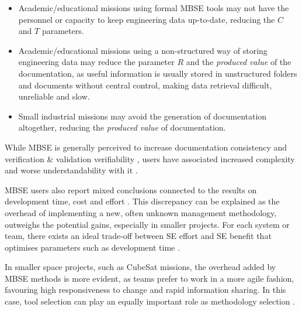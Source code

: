 \documentclass[]{iac}
\begin{document}
\begin{itemize}
    \item Academic/educational missions using formal \acs{MBSE} tools may not have the personnel or capacity to keep engineering data up-to-date, reducing the \(C\) and \(T\) parameters.
    \item Academic/educational missions using a non-structured way of storing engineering data may reduce the parameter \(R\) and the \emph{produced value} of the documentation, as useful information is usually stored in unstructured folders and documents without central control, making data retrieval difficult, unreliable and slow.
    \item Small industrial missions may avoid the generation of documentation altogether, reducing the \emph{produced value} of documentation.
\end{itemize}

While \acf{MBSE} is generally perceived to increase documentation consistency and verification \& validation verifiability \autocite{campo_model-based_2023,henderson_value_2021}, users have associated increased complexity and worse understandability with it \autocite{campo_model-based_2023}.

\ac{MBSE} users also report mixed conclusions connected to the results on development time, cost and effort \autocite{campo_model-based_2023}. This discrepancy can be explained as the overhead of implementing a new, often unknown management methodology, outweighs the potential gains, especially in smaller projects. For each system or team, there exists an ideal trade-off between \ac{SE} effort and \ac{SE} benefit that optimises parameters such as development time \autocite{boehm_roi_2008}.

In smaller space projects, such as CubeSat missions, the overhead added by \acs{MBSE} methods is more evident, as teams prefer to work in a more agile fashion, favouring high responsiveness to change and rapid information sharing. In this case, tool selection can play an equally important role as methodology selection \autocite{honore-livermore_managing_2021}.
\end{document}
